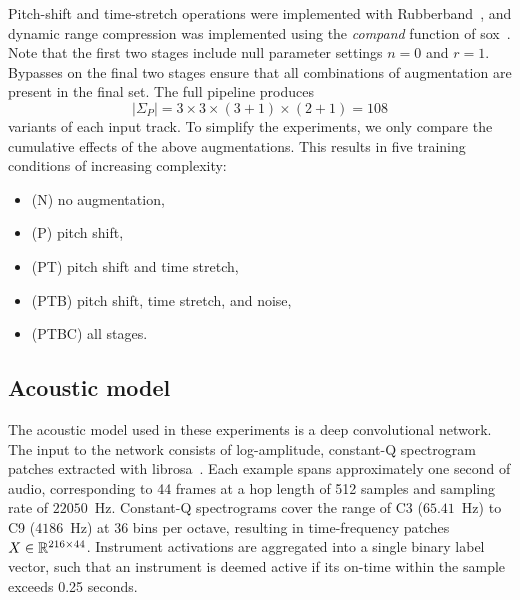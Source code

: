 \documentclass{article}
\begin{document}
Pitch-shift and time-stretch operations were implemented with Rubberband~\cite{rubberband}, 
and dynamic range compression was implemented using the \emph{compand} function of 
sox~\cite{sox}.
Note that the first two stages include null parameter settings $n=0$ and $r=1$.
Bypasses on the final two stages ensure that all combinations of augmentation are
present in the final set.
The full pipeline produces \[
|\Sigma_P| = 3\times 3\times (3+1)\times (2+1) = 108\]
variants of each input track.  To simplify the experiments, we only compare the cumulative effects of the above
augmentations.  This results in five training conditions of increasing complexity:
\begin{itemize}
    \item (N) no augmentation,
        \vspace{-.5\baselineskip}
    \item (P) pitch shift,
        \vspace{-.5\baselineskip}
    \item (PT) pitch shift and time stretch,
        \vspace{-.5\baselineskip}
    \item (PTB) pitch shift, time stretch, and noise,
        \vspace{-.5\baselineskip}
    \item (PTBC) all stages.
\end{itemize}

\subsection{Acoustic model}

%
%

The acoustic model used in these experiments is a deep convolutional network.
The input to the network consists of log-amplitude, constant-Q spectrogram patches extracted with librosa~\cite{librosa}.
Each example spans approximately one second of audio, corresponding to 44 frames at a hop length of 512 samples and sampling rate of $22050$~Hz.
Constant-Q spectrograms cover the range of C3 ($65.41$~Hz) to C9 ($4186$~Hz) at 36 bins
per octave, resulting in time-frequency patches $X \in \mathbb{R}^{216\times44}$.
Instrument activations are aggregated into a single binary label vector, such that an instrument is deemed active if its on-time within the sample exceeds 0.25 seconds.
\end{document}
